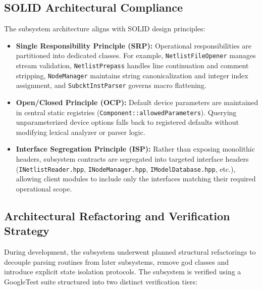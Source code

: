 \subsection{SOLID Architectural Compliance}

The subsystem architecture aligns with SOLID design principles:

\begin{itemize}
    \item \textbf{Single Responsibility Principle (SRP):} Operational responsibilities are partitioned into dedicated classes. For example, \texttt{NetlistFileOpener} manages stream validation, \texttt{NetlistPrepass} handles line continuation and comment stripping, \texttt{NodeManager} maintains string canonicalization and integer index assignment, and \texttt{SubcktInstParser} governs macro flattening.
    \item \textbf{Open/Closed Principle (OCP):} Default device parameters are maintained in central static registries (\texttt{Component::allowedParameters}). Querying unparameterized device options falls back to registered defaults without modifying lexical analyzer or parser logic.
    \item \textbf{Interface Segregation Principle (ISP):} Rather than exposing monolithic headers, subsystem contracts are segregated into targeted interface headers (\texttt{INetlistReader.hpp}, \texttt{INodeManager.hpp}, \texttt{IModelDatabase.hpp}, etc.), allowing client modules to include only the interfaces matching their required operational scope.
\end{itemize}

\subsection{Architectural Refactoring and Verification Strategy}

During development, the subsystem underwent planned structural refactorings to decouple parsing routines from later subsystems, remove god classes and introduce explicit state isolation protocols. The subsystem is verified using a GoogleTest suite structured into two distinct verification tiers:

